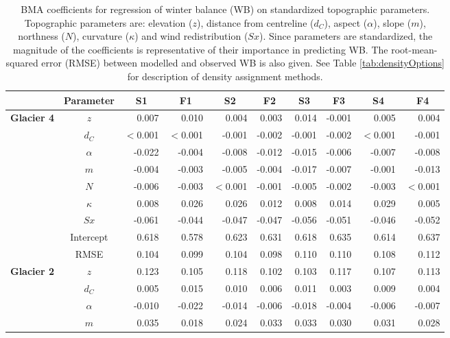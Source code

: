 \documentclass{sfuthesis}
\newcommand{\params}{Topographic parameters are: elevation ($z$), distance from centreline ($d_C$), aspect ($\alpha$), slope ($m$), northness ($N$), curvature ($\kappa$) and wind redistribution ($Sx$). }
\begin{document}
\begin{table}
\footnotesize
\centering
\caption[BMA coefficients for regression of winter balance (WB) on standardized topographic parameters]{BMA coefficients for regression of winter balance (WB) on standardized topographic parameters. \params  Since parameters are standardized, the magnitude of the coefficients is representative of their importance in predicting WB. The root-mean-squared error (RMSE) between modelled and observed WB is also given. See Table \ref{tab:densityOptions} for description of density assignment methods.}
\label{tab:BMAcoeffFull}
\begin{tabular}{ccrrrrrrrr}
\textbf{} & \textbf{Parameter} & \multicolumn{1}{c}{\textbf{S1}} & \multicolumn{1}{c}{\textbf{F1}} & \multicolumn{1}{c}{\textbf{S2}} & \multicolumn{1}{c}{\textbf{F2}} & \multicolumn{1}{c}{\textbf{S3}} & \multicolumn{1}{c}{\textbf{F3}} & \multicolumn{1}{c}{\textbf{S4}} & \multicolumn{1}{c}{\textbf{F4}} \\ \hline \hline
\multirow{9}{*}{\textbf{Glacier 4}} & $z$ & 0.007 & 0.010 & 0.004 & 0.003 & 0.014 & -0.001 & 0.005 & 0.004 \\
 & $d_C$ & $<$0.001 & $<$0.001 & -0.001 & -0.002 & -0.001 & -0.002 & $<$0.001 & -0.001 \\
 & $\alpha$ & -0.022 & -0.004 & -0.008 & -0.012 & -0.015 & -0.006 & -0.007 & -0.008 \\
 & $m$ & -0.004 & -0.003 & -0.005 & -0.004 & -0.017 & -0.007 & -0.001 & -0.013 \\
 & $N$ & -0.006 & -0.003 & $<$0.001 & -0.001 & -0.005 & -0.002 & -0.003 & $<$0.001 \\
 & $\kappa$ & 0.008 & 0.026 & 0.026 & 0.012 & 0.008 & 0.014 & 0.029 & 0.005 \\
 & $Sx$ & -0.061 & -0.044 & -0.047 & -0.047 & -0.056 & -0.051 & -0.046 & -0.052 \\
 & Intercept & 0.618 & 0.578 & 0.623 & 0.631 & 0.618 & 0.635 & 0.614 & 0.637 \\
 & RMSE & 0.104 & 0.099 & 0.104 & 0.098 & 0.110 & 0.110 & 0.108 & 0.112 \\ \hline
\multirow{9}{*}{\textbf{Glacier 2}} & $z$ & 0.123 & 0.105 & 0.118 & 0.102 & 0.103 & 0.117 & 0.107 & 0.113 \\
 & $d_C$ & 0.005 & 0.015 & 0.010 & 0.006 & 0.011 & 0.003 & 0.009 & 0.004 \\
 & $\alpha$ & -0.010 & -0.022 & -0.014 & -0.006 & -0.018 & -0.004 & -0.006 & -0.007 \\
 & $m$ & 0.035 & 0.018 & 0.024 & 0.033 & 0.033 & 0.030 & 0.031 & 0.028 \\

\end{tabular}
\end{table}
\end{document}
